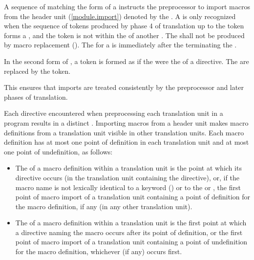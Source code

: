 \begin{std.txt}
\color{addclr}
\pnum
A sequence of  matching the form
of a 
instructs the preprocessor to import macros from the header unit
(\ref{module.import}) denoted by the .
A  is only recognized when the sequence of tokens
produced by phase 4 of translation up to the  token
forms a , and the  token is not
within the  of another .
The \tcode{;}  shall not be produced by
macro replacement ().
The  for a  is
immediately after the \tcode{;} terminating the .

\color{addclr}
\pnum
In the second form of ,
a  token is formed as if
the 
were the  of a  directive.
The  are replaced by
the  token.
\begin{note}
This ensures that imports are treated consistently by
the preprocessor and later phases of translation.
\end{note}

\color{addclr}
\pnum
Each  directive encountered when preprocessing
each translation unit in a program results in a distinct
.
Importing macros from a header unit makes macro definitions
from a translation unit visible in other translation units.
Each macro definition has at most one point of definition in
each translation unit and at most one point of undefinition, as follows:
\begin{itemize}
\item
The  of a macro definition within a translation unit
is the point at which its  directive occurs (in the translation
unit containing the  directive), or,
if the macro name is not lexically identical to a keyword ()
or to the   or ,
the first point
of macro import of a translation unit containing a point of definition for the
macro definition, if any (in any other translation unit).

\item
The  of a macro definition within a translation unit
is the first point at which a  directive naming the macro occurs
after its point of definition, or the first point
of macro import of a translation unit containing a point of undefinition for the
macro definition, whichever (if any) occurs first.
\end{itemize}


\end{std.txt}
